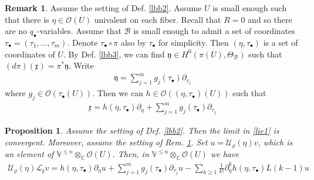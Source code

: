 \documentclass[11pt,b5paper,notitlepage]{article}
\theoremstyle{definition}
\newtheorem{rem}[df]{Remark}
\theoremstyle{plain}
\newtheorem{pp}[df]{Proposition}
\newcommand{\mc}{\mathcal}
\newcommand{\xk}{\mathfrak x}
\newcommand{\yk}{\mathfrak y}
\newcommand{\blt}{\bullet}
\newcommand{\Vbb}{\mathbb V}
\newcommand{\Cbb}{\mathbb C}
\newcommand{\<}{\left\langle}
\renewcommand{\>}{\right\rangle}
\newcommand{\MO}{\mathcal{O}}
\newcommand{\MB}{\mathcal{B}}
\numberwithin{equation}{section}
\begin{document}
\begin{rem}\label{lbb68}
Assume the setting of Def. \ref{lbb2}. Assume $U$ is small enough such that there is $\eta\in \MO(U)$ univalent on each fiber. Recall that $R=0$ and so there are no $q_\blt$-variables. Assume that $\MB$ is small enough to admit a set of coordinates $\tau_\blt=(\tau_1,\dots,\tau_m)$. Denote $\tau_\blt\circ \pi$ also by $\tau_\blt$ for simplicity. Then $(\eta,\tau_\blt)$ is a set of coordinates of $U$. By Def. \ref{lbb3}, we can find $\yk\in H^0(\pi(U),\Theta_\MB)$ such that $(d\pi)(\xk)=\pi^*\yk$. Write
\begin{align}
\yk=\sum_{j=1}^m g_j(\tau_\blt)\partial_{\tau_j}
\end{align}
where $g_j\in\mc O(\tau_\blt(U))$. Then we can $h\in \mc O((\eta,\tau_\blt)(U))$ such that
\begin{align}\label{eqb21}
    \xk=h(\eta,\tau_\blt)\partial_\eta+\sum_{j=1}^m g_j(\tau_\blt)\partial_{\tau_j}
\end{align}
\end{rem}




\begin{pp}\label{lbb5}
Assume the setting of Def. \ref{lbb2}. Then the limit in \eqref{lie1} is convergent. Moreover, assume the setting of Rem. \ref{lbb68}. Set $u=\mc U_\varrho(\eta)v$, which is an element of $\Vbb^{\leq n}\otimes_\Cbb\mc O(U)$. Then, in $\Vbb^{\leq n}\otimes_\Cbb\mc O(U)$ we have
\begin{align}\label{eqb24}
\mc U_\varrho(\eta)\mc L_\xk v=
    h(\eta,\tau_\blt)\partial_\eta u+\sum_{j=1}^m g_j(\tau_\blt)\partial_{\tau_j}u-\sum_{k\geq 1}\frac{1}{k!}\partial_\eta^k h(\eta,\tau_\blt)L(k-1)u
\end{align}
\end{pp}
\end{document}
